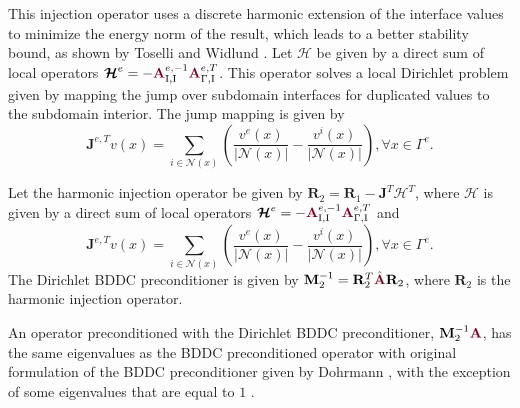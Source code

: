 This injection operator uses a discrete harmonic extension of the interface values to minimize the energy norm of the result, which leads to a better stability bound, as shown by Toselli and Widlund \cite{toselli2006domain}.
Let $\boldsymbol{\mathcal{H}}$ be given by a direct sum of local operators $\boldsymbol{\mathcal{H}}^e = - {\color{burgundy}\mathbf{A}}_{\text{I}, \text{I}}^{e, -1} {\color{burgundy}\mathbf{A}}_{\Gamma, \text{I}}^{e, T}$.
This operator solves a local Dirichlet problem given by mapping the jump over subdomain interfaces for duplicated values to the subdomain interior.
The jump mapping is given by
\begin{equation}
\mathbf{J}^{e, T} v \left( x \right) = \sum_{i \in \mathcal{N} \left( x \right)} \left( \frac{v^e \left( x \right)}{\lvert \mathcal{N} \left( x \right) \rvert} - \frac{v^i \left( x \right)}{\lvert \mathcal{N} \left( x \right) \rvert} \right), \forall x \in \Gamma^e.
\end{equation}

\begin{definition}
Let the harmonic injection operator be given by $\mathbf{R}_2 = \mathbf{R}_1 - \mathbf{J}^T \boldsymbol{\mathcal{H}}^T$, where $\boldsymbol{\mathcal{H}}$ is given by a direct sum of local operators $\boldsymbol{\mathcal{H}}^e = - {\color{burgundy}\mathbf{A}}_{\text{I}, \text{I}}^{e, -1} {\color{burgundy}\mathbf{A}}_{\Gamma, \text{I}}^{e, T}$ and
\begin{equation}
\mathbf{J}^{e, T} v \left( x \right) = \sum_{i \in \mathcal{N} \left( x \right)} \left( \frac{v^e \left( x \right)}{\lvert \mathcal{N} \left( x \right) \rvert} - \frac{v^i \left( x \right)}{\lvert \mathcal{N} \left( x \right) \rvert} \right), \forall x \in \Gamma^e.
\end{equation}
The Dirichlet BDDC preconditioner is given by $\mathbf{M}^{-1}_2 = \mathbf{R}_2^T \hat{\color{burgundy}\mathbf{A}} \mathbf{R}_2$, where $\mathbf{R}_2$ is the harmonic injection operator.
\label{def:dirichletbddc}
\end{definition}

An operator preconditioned with the Dirichlet BDDC preconditioner, $\mathbf{M}^{-1}_2 {\color{burgundy}\mathbf{A}}$, has the same eigenvalues as the BDDC preconditioned operator with original formulation of the BDDC preconditioner given by Dohrmann \cite{dohrmann2003preconditioner}, with the exception of some eigenvalues that are equal to $1$ \cite{li2007use}.
